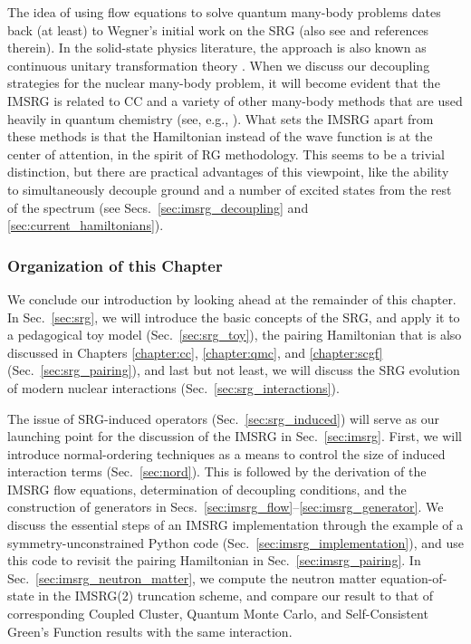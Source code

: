 {The idea of using flow equations to solve quantum many-body problems
dates back (at least) to Wegner's initial work on the SRG \cite{Wegner:1994dk} 
(also see \cite{Kehrein:2006kx} and references therein). In the 
solid-state physics literature, the approach is also known as 
continuous unitary transformation theory  
\cite{Heidbrink:2002kx,Drescher:2011kx,Krull:2012bs,Fauseweh:2013zv,Krones:2015ft}.
When we discuss our decoupling strategies for the nuclear many-body
problem, it will become evident that the IMSRG is related to CC 
and a variety of other many-body methods that are used heavily in 
quantum chemistry (see, e.g., \cite{Shavitt:2009,Hagen:2014ve,White:2002fk,
Yanai:2007kx,Nakatsuji:1976yq,Mukherjee:2001uq,Mazziotti:2006fk,Evangelista:2014rq}).
What sets the IMSRG apart from these methods is that the Hamiltonian 
instead of the wave function is at the center of attention, in the
spirit of RG methodology. This seems to be a trivial distinction, but
there are practical advantages of this viewpoint, like the ability to
simultaneously decouple ground and a number of excited states from the
rest of the spectrum (see Secs.~\ref{sec:imsrg_decoupling} and 
\ref{sec:current_hamiltonians}). 


%
%
\subsubsection*{Organization of this Chapter}
We conclude our introduction by looking ahead at the remainder of this
chapter. In Sec.~\ref{sec:srg}, we will introduce the basic concepts of
the SRG, and apply it to a pedagogical toy model
(Sec.~\ref{sec:srg_toy}), the pairing Hamiltonian that is also discussed 
in Chapters \ref{chapter:cc}, \ref{chapter:qmc}, and \ref{chapter:scgf} 
(Sec.~\ref{sec:srg_pairing}), and last but not least, we will discuss the 
SRG evolution of modern nuclear interactions (Sec.~\ref{sec:srg_interactions}). 

The issue of SRG-induced operators (Sec.~\ref{sec:srg_induced}) will serve 
as our launching point for the discussion of the IMSRG in Sec.~\ref{sec:imsrg}.
First, we will introduce normal-ordering techniques as a means to control the 
size of induced interaction terms (Sec.~\ref{sec:nord}). This is followed
by the derivation of the IMSRG flow equations, determination of decoupling
conditions, and the construction of generators in Secs.~\ref{sec:imsrg_flow}--\ref{sec:imsrg_generator}.
We discuss the essential steps of an IMSRG implementation through the 
example of a symmetry-unconstrained Python code (Sec.~\ref{sec:imsrg_implementation}), 
and use this code to revisit the pairing Hamiltonian in Sec.~\ref{sec:imsrg_pairing}.
In Sec.~\ref{sec:imsrg_neutron_matter}, we compute the neutron matter 
equation-of-state in the IMSRG(2) truncation scheme, and compare our result
to that of corresponding Coupled Cluster, Quantum Monte Carlo, and Self-Consistent 
Green's Function results with the same interaction. 

}
